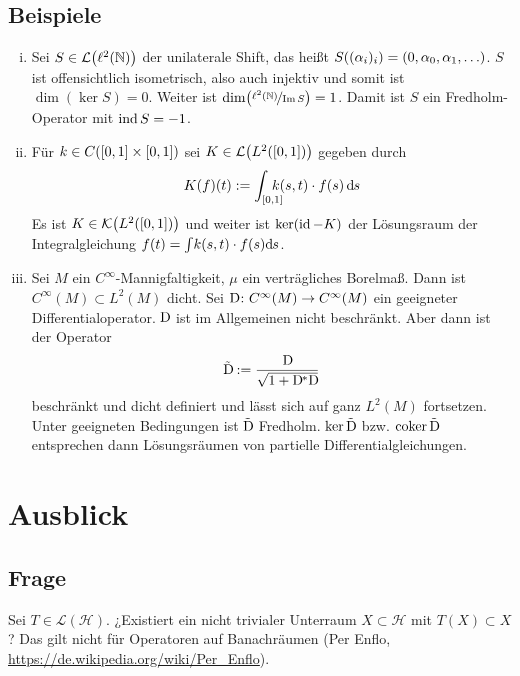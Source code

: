 \subsection[Beispiele für Fredholm-Operatoren]{Beispiele} %
\label{sub:95}
\begin{enumerate}[(i)]
	\item Sei $S \in \mathcal{L}\enbrace*{\ell^2(\mathds{N})}$ der unilaterale Shift, das heißt
	$S \enbrace*{(\alpha_i)_i}= (0, \alpha_0, \alpha_1, \ldots )$. $S$ ist offensichtlich isometrisch, also auch injektiv und somit ist $\dim (\ker S)=0$. Weiter ist
	$\dim \enbrace*{\nicefrac{\ell^2(\mathds{N})}{\im S}} =1$. Damit ist $S$ ein Fredholm-Operator mit $\operatorname{ind} S = -1$.
	\item Für $k \in C \enbrace*{[0,1] \times [0,1]}$ sei $K \in \mathcal{L} \enbrace*{L^2([0,1])}$ gegeben durch
	\[
		K(f)(t) := \int_{[0,1]}\hspace{-1em} k(s,t)\cdot f(s)\,\mathrm{d}\mkern-1.0mu s
	\]
	Es ist $K \in \mathcal{K} \enbrace*{L^2([0,1])}$ und weiter ist $\ker(\operatorname{id}-K)$ der Lösungsraum der Integralgleichung $f(t)= \int \!k(s,t)\cdot f(s) \mathrm{d}\mkern-1.0mu s$.
	\item Sei $M$ ein $C^\infty$-Mannigfaltigkeit, $\mu$ ein verträgliches Borelmaß. Dann ist $C^\infty(M) \subset L^2(M)$ dicht. Sei $\mathrm{D}\mkern-1.5mu \colon C^\infty(M) \to C^\infty(M)$
	ein geeigneter Differentialoperator. $\mathrm{D}\mkern-1.5mu$ ist im Allgemeinen nicht beschränkt. Aber dann ist der Operator 
	\[
		\tilde{\mathrm{D}\mkern-1.5mu} := \frac{\mathrm{D}\mkern-1.5mu}{\sqrt{1+ \mathrm{D}\mkern-1.5mu^* \mathrm{D}\mkern-1.5mu}} 
	\]
	beschränkt und dicht definiert und lässt sich auf ganz $L^2(M)$ fortsetzen. Unter geeigneten Bedingungen ist $\tilde{\mathrm{D}\mkern-1.5mu}$ Fredholm. $\ker \tilde{\mathrm{D}\mkern-1.5mu}$ bzw. 
	$\operatorname{coker} \tilde{\mathrm{D}\mkern-1.5mu}$ entsprechen dann Lösungsräumen von partielle Differentialgleichungen.
\end{enumerate}
\newpage

\section{Ausblick} %
\label{sec:10}

\subsection{Frage} %
\label{sub:101}
Sei $T \in \mathcal{L}(\mathcal{H})$. ¿Existiert ein nicht trivialer Unterraum $X \subset \mathcal{H}$ mit $T(X) \subset X$? Das gilt nicht für Operatoren auf Banachräumen 
(Per Enflo, \url{https://de.wikipedia.org/wiki/Per_Enflo}).

